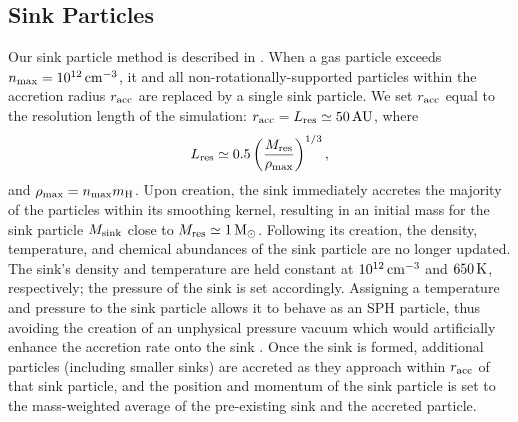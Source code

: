\documentclass[usenatbib]{mn2e}
\newcommand{\kelvin}{\,{\rm K}}
\newcommand{\cc}{\,{\rm cm}^{-3}}
\newcommand{\msun}{\,{\rm M}_{\odot}}
\newcommand{\au}{\,{\rm AU}}
\begin{document}
\subsection{Sink Particles}
\label{sinkParticles}
Our sink particle method is described in \citet{StacyGreifBromm2010}. 
When a gas particle exceeds $n_{\rm max} = 10^{12}\cc$, it and all non-rotationally-supported particles within the accretion radius $r_{\rm acc}$ are replaced by a single sink particle.  
We set $r_{\rm acc}$ equal to the resolution length of the simulation: $r_{\rm acc} = L_{\rm res} \simeq 50\au$, where 
\begin{equation}
L_{\rm res} \simeq 0.5 \left( \frac{M_{\rm res}}{\rho_{\rm max}} \right)^{1/3},
\end{equation}
and $\rho_{\rm max} = n_{\rm max} m_{\rm H}$.  
Upon creation, the sink immediately accretes the majority of the particles within its smoothing kernel, resulting in an initial mass for the sink particle $M_{\rm sink}$ close to $M_{\rm res} \simeq 1\msun$.  
Following its creation, the density, temperature, and chemical abundances of the sink particle are no longer updated.  
The sink's density and temperature are held constant at $10^{12}\cc$ and $650\kelvin$, respectively; the pressure of the sink is set accordingly. 
Assigning a temperature and pressure to the sink particle allows it to behave as an SPH particle, thus avoiding the creation of an unphysical pressure vacuum which would artificially enhance the accretion rate onto the sink \citep[see][]{BrommCoppiLarson2002, MartelEvansShapiro2006}. 
Once the sink is formed, additional particles (including smaller sinks) are accreted as they approach within $r_{\rm acc}$ of that sink particle, and the position and momentum of the sink particle is set to the mass-weighted average of the pre-existing sink and the accreted particle.
\end{document}
